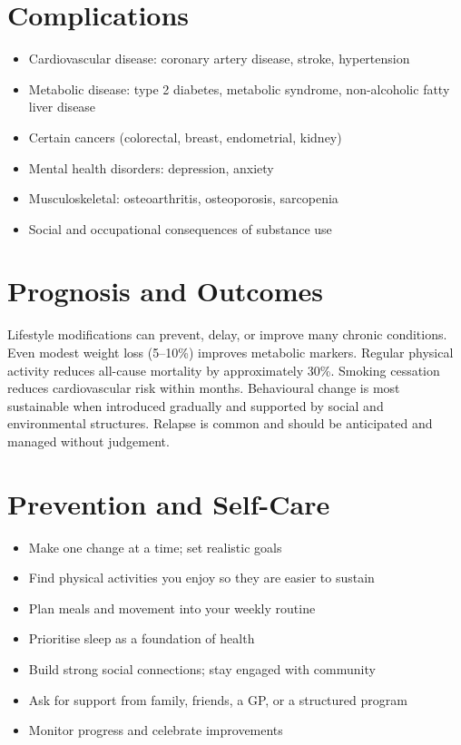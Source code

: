 \section*{Complications}
\begin{itemize}
    \item Cardiovascular disease: coronary artery disease, stroke, hypertension
    \item Metabolic disease: type 2 diabetes, metabolic syndrome, non-alcoholic fatty liver disease
    \item Certain cancers (colorectal, breast, endometrial, kidney)
    \item Mental health disorders: depression, anxiety
    \item Musculoskeletal: osteoarthritis, osteoporosis, sarcopenia
    \item Social and occupational consequences of substance use
\end{itemize}

\section*{Prognosis and Outcomes}
Lifestyle modifications can prevent, delay, or improve many chronic conditions. Even modest weight loss (5--10\%) improves metabolic markers. Regular physical activity reduces all-cause mortality by approximately 30\%. Smoking cessation reduces cardiovascular risk within months. Behavioural change is most sustainable when introduced gradually and supported by social and environmental structures. Relapse is common and should be anticipated and managed without judgement.

\section*{Prevention and Self-Care}
\begin{itemize}
    \item Make one change at a time; set realistic goals
    \item Find physical activities you enjoy so they are easier to sustain
    \item Plan meals and movement into your weekly routine
    \item Prioritise sleep as a foundation of health
    \item Build strong social connections; stay engaged with community
    \item Ask for support from family, friends, a GP, or a structured program
    \item Monitor progress and celebrate improvements
\end{itemize}
